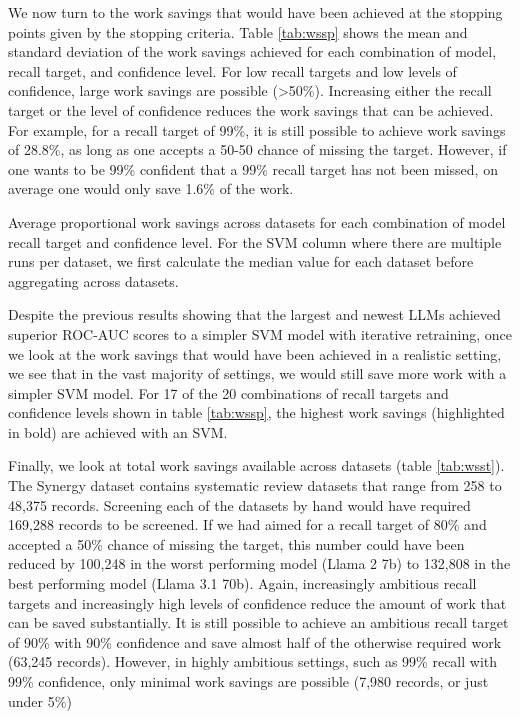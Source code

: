\documentclass{article}
\begin{document}
	We now turn to the work savings that would have been achieved at the stopping points given by the stopping criteria. Table \ref{tab:wssp} shows the mean and standard deviation of the work savings achieved for each combination of model, recall target, and confidence level. For low recall targets and low levels of confidence, large work savings are possible (\textgreater50\%). Increasing either the recall target or the level of confidence reduces the work savings that can be achieved. For example, for a recall target of 99\%, it is still possible to achieve work savings of 28.8\%, as long as one accepts a 50-50 chance of missing the target. However, if one wants to be 99\% confident that a 99\% recall target has not been missed, on average one would only save 1.6\% of the work.
	
	\begin{table}
		\centering
		
		\caption{Average proportional work savings across datasets for each combination of  model recall target and confidence level. For the SVM column where there are multiple runs per dataset, we first calculate the median value for each dataset before aggregating across datasets.}
		\label{tab:wsst}
	\end{table}
	
	Despite the previous results showing that the largest and newest LLMs achieved superior ROC-AUC scores to a simpler SVM model with iterative retraining, once we look at the work savings that would have been achieved in a realistic setting, we see that in the vast majority of settings, we would still save more work with a simpler SVM model. For 17 of the 20 combinations of recall targets and confidence levels shown in table \ref{tab:wssp}, the highest work savings (highlighted in bold) are achieved with an SVM.
	
	Finally, we look at total work savings available across datasets (table \ref{tab:wsst}). The Synergy dataset contains systematic review datasets that range from 258 to 48,375 records. 
	Screening each of the datasets by hand would have required 169,288 records to be screened.	
	If we had aimed for a recall target of 80\% and accepted a 50\% chance of missing the target, this number could have been reduced by 100,248 in the worst performing model (Llama 2 7b) to 132,808 in the best performing model (Llama 3.1 70b).
	Again, increasingly ambitious recall targets and increasingly high levels of confidence reduce the amount of work that can be saved substantially. It is still possible to achieve an ambitious recall target of 90\% with 90\% confidence and save almost half of the otherwise required work (63,245 records). However, in highly ambitious settings, such as 99\% recall with 99\% confidence, only minimal work savings are possible (7,980 records, or just under 5\%)
\end{document}
